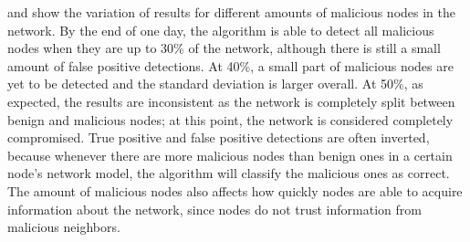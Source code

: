 %
%	


%
%


\pagebreak
{} and  show the variation of results for different amounts of malicious nodes in the network.
By the end of one day, the algorithm is able to detect all malicious nodes when they are up to 30\% of the network, although there is still a small amount of false positive detections.
At 40\%, a small part of malicious nodes are yet to be detected and the standard deviation is larger overall.
At 50\%, as expected, the results are inconsistent as the network is completely split between benign and malicious nodes; at this point, the network is considered completely compromised.
True positive and false positive detections are often inverted, because whenever there are more malicious nodes than benign ones in a certain node's network model, the algorithm will classify the malicious ones as correct.
The amount of malicious nodes also affects how quickly nodes are able to acquire information about the network, since nodes do not trust information from malicious neighbors.

